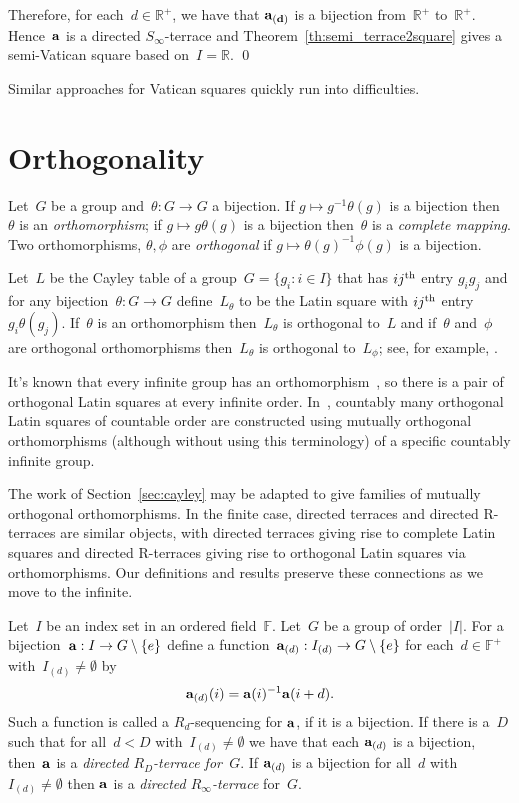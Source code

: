 \documentclass[12pt,a4paper]{article}
\newcommand{\R}{\mathbb{R}}
\newcommand{\F}{\mathbb{F}}
\renewcommand{\a}{\textup{\textbf{a}}}
\begin{document}
Therefore, for each~$d \in \R^+$, we have that ${\bf a_{(d)}}$ is a bijection from~$\R^+$ to~$\R^+$.  Hence~${\bf a}$ is a directed $S_{\infty}$-terrace and Theorem~\ref{th:semi_terrace2square} gives a semi-Vatican square based on~$I = \R$.
\qed

Similar approaches for Vatican squares quickly run into difficulties.



\section{Orthogonality}\label{sec:orth}

Let~$G$ be a group and~$\theta: G \rightarrow G$ a bijection.  If $g \mapsto g^{-1}\theta(g)$ is a bijection then~$\theta$ is an {\em orthomorphism}; if  $g \mapsto g\theta(g)$ is a bijection then~$\theta$ is a {\em complete mapping}.  Two orthomorphisms, $\theta, \phi$ are {\em orthogonal} if $g \mapsto \theta(g)^{-1} \phi(g)$ is a bijection.

Let~$L$ be the Cayley table of a group~$G = \{ g_i : i \in I \}$ that has $ij^{\rm th}$ entry $g_i g_j$ and for any bijection~$\theta: G \rightarrow G$ define~$L_\theta$ to be the Latin square with $ij^{\rm th}$ entry $g_i \theta(g_j)$.  If~$\theta$ is an orthomorphism then~$L_\theta$ is orthogonal to~$L$ and if~$\theta$ and~$\phi$ are orthogonal orthomorphisms then~$L_\theta$ is orthogonal to~$L_\phi$; see, for example, \cite{Evans07}.

It's known that every infinite group has an orthomorphism~\cite{Bateman50}, so there is a pair of orthogonal Latin squares at every infinite order.  In~\cite{BM91}, countably many orthogonal Latin squares of countable order are constructed using mutually orthogonal orthomorphisms (although without using this terminology) of a specific countably infinite group.


The work of Section~\ref{sec:cayley} may be adapted to give families of mutually orthogonal orthomorphisms.  In the finite case, directed terraces and directed R-terraces are similar objects, with directed terraces giving rise to complete Latin squares and directed R-terraces giving rise to orthogonal Latin squares via orthomorphisms.  Our definitions and results preserve these connections as we move to the infinite.

Let~$I$ be an index set in an ordered field~$\F$.  Let~$G$ be a group of order~$|I|$.  For a bijection~${\bf a}: I \rightarrow G \setminus \{ e \}$ define a function~${\bf a}_{(d)}: I_{(d)} \rightarrow G \setminus \{ e \}$ for each~$d \in \F^+$ with~$I_{(d)} \neq \emptyset$ by
$${\bf a}_{(d)}(i) = {\bf a}(i)^{-1}{\bf a}(i+d).$$ Such a function is called a $R_d$-sequencing for $\a$, if it is a bijection.
If there is a~$D$ such that for all~$d < D$ with~$I_{(d)} \neq \emptyset$ we have that each ${\bf a}_{(d)}$ is a bijection, then~${\bf a}$ is a {\em directed $R_D$-terrace for~$G$}.  If ${\bf a}_{(d)}$ is a bijection for all~$d$  with~$I_{(d)} \neq \emptyset$ then ${\bf a}$ is  a {\em directed $R_{\infty}$-terrace} for~$G$.
\end{document}
